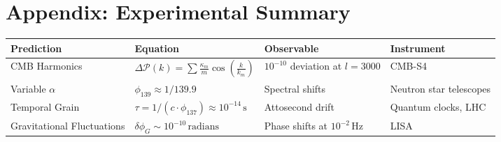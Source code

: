 \documentclass[12pt]{article}
\begin{document}
\section*{Appendix: Experimental Summary}
\begin{tabularx}{\textwidth}{|>{\raggedright\arraybackslash}p{}|>{\raggedright\arraybackslash}p{}|>{\raggedright\arraybackslash}p{}|>{\raggedright\arraybackslash}p{}|}
\hline
\textbf{Prediction} & \textbf{Equation} & \textbf{Observable} & \textbf{Instrument} \\
\hline
CMB Harmonics & \(\Delta \mathcal{P}(k) = \sum \frac{\kappa_m}{m} \cos\left(\frac{k}{k_m}\right)\) & \(10^{-10}\) deviation at \(l = 3000\) & CMB-S4 \\
\hline
Variable \(\alpha\) & \(\phi_{139} \approx 1/139.9\) & Spectral shifts & Neutron star telescopes \\
\hline
Temporal Grain & \(\tau = 1/(c \cdot \phi_{137}) \approx 10^{-14} \, \text{s}\) & Attosecond drift & Quantum clocks, LHC \\
\hline
Gravitational Fluctuations & \(\delta \phi_G \sim 10^{-10} \, \text{radians}\) & Phase shifts at \(10^{-2} \, \text{Hz}\) & LISA \\
\hline
\end{tabularx}
\end{document}
